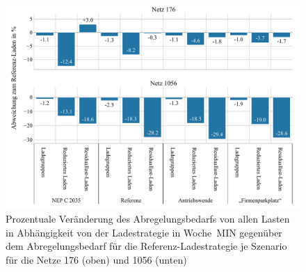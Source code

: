 \begin{figure}[H]
    \centering
    \includegraphics[width=\textwidth]{Bilder/176_1056_cur_load_grid_week_A}
    \caption{Prozentuale Veränderung des Abregelungsbedarfs von allen Lasten in Abhängigkeit von der Ladestrategie in Woche~MIN gegenüber dem Abregelungsbedarf für die Referenz-Ladestrategie je Szenario für die Netze \num{176} (oben) und \num{1056} (unten)}\label{fig:176_1056_cur_load_grid_week_A}
\end{figure}